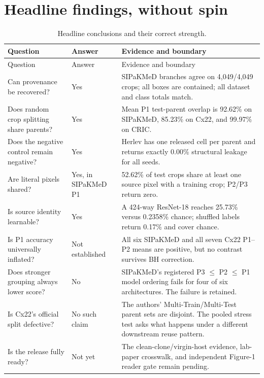 \section{Headline findings, without spin}

\begin{longtable}{p{}p{}p{}}
\caption{Headline conclusions and their correct strength.}\label{s1:tab:headline}\\
\toprule
Question & Answer & Evidence and boundary \\
\midrule
\endfirsthead
\toprule
Question & Answer & Evidence and boundary \\
\midrule
\endhead
\bottomrule
\endfoot
Can provenance be recovered? & Yes & SIPaKMeD branches agree on 4,049/4,049 crops; all boxes are contained; all dataset and class totals match. \\
Does random crop splitting share parents? & Yes & Mean P1 test-parent overlap is 92.62\% on SIPaKMeD, 85.23\% on Cx22, and 99.97\% on CRIC. \\
Does the negative control remain negative? & Yes & Herlev has one released cell per parent and returns exactly 0.00\% structural leakage for all seeds. \\
Are literal pixels shared? & Yes, in SIPaKMeD P1 & 52.62\% of test crops share at least one source pixel with a training crop; P2/P3 return zero. \\
Is source identity learnable? & Yes & A 424-way ResNet-18 reaches 25.73\% versus 0.2358\% chance; shuffled labels return 0.17\% and cover chance. \\
Is P1 accuracy universally inflated? & Not established & All six SIPaKMeD and all seven Cx22 P1--P2 means are positive, but no contrast survives BH correction. \\
Does stronger grouping always lower score? & No & SIPaKMeD's registered P3 $\leq$ P2 $\leq$ P1 model ordering fails for four of six architectures. The failure is retained. \\
Is Cx22's official split defective? & No such claim & The authors' Multi-Train/Multi-Test parent sets are disjoint. The pooled stress test asks what happens under a different downstream reuse pattern. \\
Is the release fully ready? & Not yet & The clean-clone/virgin-host evidence, lab-paper crosswalk, and independent Figure-1 reader gate remain pending. \\
\end{longtable}
